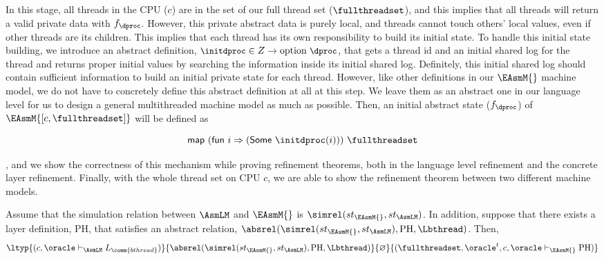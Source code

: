 In this stage, all threads in the CPU ($c$) are in the set of our full thread set ($\fullthreadset$), and this implies that all threads will return a valid private data with $f_{\dproc}$.
However, this private abstract data is purely local, and threads cannot touch 
others' local values, even if other threads are its children.
This implies that each thread has its own responsibility to build its initial state. 
To handle this initial state building, we introduce an abstract definition,
${\small  \initdproc \in Z \rightarrow \mathrm{option}\ \dproc }$,
 that gets a thread id and an initial shared log 
for the thread and returns proper initial values by searching the information inside its initial shared log. 
Definitely, this initial shared log should contain sufficient information to build an initial private state for each thread.
However, like other definitions in our $\EAsmM{}$ machine model, 
we do not have to concretely define this abstract definition at all
at this step. 
We leave them as an abstract one in our language level for us to design a general multithreaded machine model as much as possible.
Then, an initial abstract state ($f_\dproc$) of $\EAsmM{[c, \fullthreadset]}$ will be defined as 
\begin{small}
\[
\mathsf{map}\ (\mathsf{fun}\ i \Rightarrow (\mathsf{Some}\ \initdproc(i))) \ \fullthreadset
\]
\end{small}
, and we show the correctness of this mechanism while proving refinement theorems, 
both in the language level refinement 
and the concrete layer refinement.
Finally, with the whole thread set on CPU $c$, we are able to show the refinement theorem between two different machine models.
\begin{theorem}
\label{theorem:easm_refine_lasm}
\begin{small}
Assume that the simulation relation between $\AsmLM$ and $\EAsmM{}$ is $\simrel(st_{\EAsmM{}}, st_{\AsmLM})$.
In addition, suppose that there exists a layer definition, $\mathrm{PH}$, that satisfies an abstract relation, $\absrel(\simrel(st_{\EAsmM{}}, st_{\AsmLM}), \mathrm{PH}, \Lbthread)$. Then,
$$\ltyp{(c, \oracle\vdash_{\AsmLM} L_\comm{bthread})}{\absrel(\simrel(st_{\EAsmM{}}, st_{\AsmLM}), \mathrm{PH}, \Lbthread)}
{\varnothing}{(\fullthreadset, \oracle^t,  c, \oracle  \vdash_{\EAsmM{}} \mathrm{PH})}$$
\end{small}
\end{theorem}


